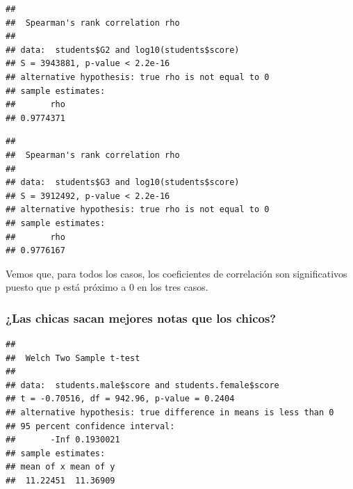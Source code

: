 \documentclass[]{article}
\newenvironment{Shaded}{\begin{snugshade}}{\end{snugshade}}
\newcommand{\DataTypeTok}[1]{\textcolor[rgb]{0.87,0.87,0.75}{#1}}
\newcommand{\FloatTok}[1]{\textcolor[rgb]{0.75,0.75,0.82}{#1}}
\newcommand{\KeywordTok}[1]{\textcolor[rgb]{0.94,0.87,0.69}{#1}}
\newcommand{\NormalTok}[1]{\textcolor[rgb]{0.80,0.80,0.80}{#1}}
\newcommand{\OperatorTok}[1]{\textcolor[rgb]{0.94,0.94,0.82}{#1}}
\newcommand{\StringTok}[1]{\textcolor[rgb]{0.80,0.58,0.58}{#1}}
\begin{document}
\begin{verbatim}
## 
##  Spearman's rank correlation rho
## 
## data:  students$G2 and log10(students$score)
## S = 3943881, p-value < 2.2e-16
## alternative hypothesis: true rho is not equal to 0
## sample estimates:
##       rho 
## 0.9774371
\end{verbatim}

\begin{Shaded}
\end{Shaded}

\begin{verbatim}
## 
##  Spearman's rank correlation rho
## 
## data:  students$G3 and log10(students$score)
## S = 3912492, p-value < 2.2e-16
## alternative hypothesis: true rho is not equal to 0
## sample estimates:
##       rho 
## 0.9776167
\end{verbatim}

Vemos que, para todos los casos, los coeficientes de correlación son
significativos puesto que p está próximo a 0 en los tres casos.

\hypertarget{las-chicas-sacan-mejores-notas-que-los-chicos}{%
\subsubsection{¿Las chicas sacan mejores notas que los
chicos?}\label{las-chicas-sacan-mejores-notas-que-los-chicos}}

\begin{Shaded}
\end{Shaded}

\begin{verbatim}
## 
##  Welch Two Sample t-test
## 
## data:  students.male$score and students.female$score
## t = -0.70516, df = 942.96, p-value = 0.2404
## alternative hypothesis: true difference in means is less than 0
## 95 percent confidence interval:
##       -Inf 0.1930021
## sample estimates:
## mean of x mean of y 
##  11.22451  11.36909
\end{verbatim}
\end{document}
